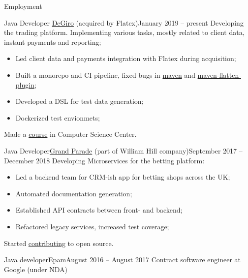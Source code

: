 \documentclass[]{mcdowellcv}
\begin{document}
	\makeheader

	\begin{cvsection}{Employment}
		\begin{cvsubsection}{Java Developer }{\href{https://degiro.nl}{DeGiro} (acquired by Flatex)}{January 2019 -- present}
			Developing the trading platform. Implementing various tasks, mostly related to client data, instant payments and reporting;
			\begin{itemize}
				\item Led client data and payments integration with Flatex during acquisition;
				\item Built a monorepo and CI pipeline, fixed bugs in
				\href{https://github.com/apache/maven/pull/347}{maven}
				and  \href{https://github.com/mojohaus/flatten-maven-plugin/pull/152}{maven-flatten-plugin};
				\item Developed a DSL for test data generation;
				\item Dockerized test envionmets;
			\end{itemize}
			Made a \href{https://compscicenter.ru/courses/practical-minimum/}{course} in Computer Science Center.
		\end{cvsubsection}

		\begin{cvsubsection}{Java Developer}{\href{https://grandparade.co.uk/}{Grand Parade} (part of William Hill company)}{September 2017 -- December 2018}
			Developing Microservices for the betting platform:
			\begin{itemize}
				\item Led a backend team for CRM-ish app for betting shops across the UK;
				\item Automated documentation generation;
				\item Established API contracts between front- and backend;
				\item Refactored legacy services, increased test coverage;
			\end{itemize}
			Started \href{https://github.com/apache/ignite/commits?author=dehasi}{contributing} to open source.
		\end{cvsubsection}

		\begin{cvsubsection}{Java developer}{\href{https://www.epam.com/}{Epam}}{August 2016 -- August 2017}
			Contract software engineer at Google (under NDA)
		\end{cvsubsection}


\end{cvsection}
\end{document}
